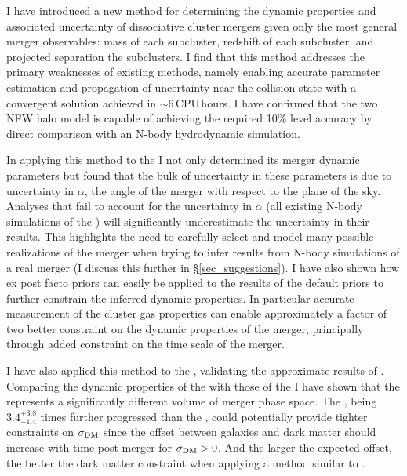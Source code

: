 \documentclass[12pt]{emulateapj}
\begin{document}
I have introduced a new method for determining the dynamic properties and associated uncertainty of dissociative cluster mergers given only the most general merger observables: mass of each subcluster, redshift of each subcluster, and projected separation the subclusters.
I find that this method addresses the primary weaknesses of existing methods, namely enabling accurate parameter estimation and propagation of uncertainty near the collision state with a convergent solution achieved in $\sim$6\,CPU\,hours. 
I have confirmed that the two NFW halo model is capable of achieving the required 10\% level accuracy by direct comparison with an N-body hydrodynamic simulation.

In applying this method to the  I not only determined its merger dynamic parameters but found that the bulk of uncertainty in these parameters is due to uncertainty in $\alpha$, the angle of the merger with respect to the plane of the sky.
Analyses that fail to account for the uncertainty in $\alpha$ (all existing N-body simulations of the ) will significantly underestimate the uncertainty in their results.
This highlights the need to carefully select and model many possible realizations of the merger when trying to infer results from N-body simulations of a real merger (I discuss this further in \S\ref{sec_suggestions}).
I have also shown how ex post facto priors can easily be applied to the results of the default priors to further constrain the inferred dynamic properties.
In particular accurate measurement of the cluster gas properties can enable approximately a factor of two better constraint on the dynamic properties of the merger, principally through added constraint on the time scale of the merger.

I have also applied this method to the , validating the approximate results of \citet{Dawson:2012dl}.
Comparing the dynamic properties of the  with those of the  I have shown that the  represents a significantly different volume of merger phase space.
The , being $3.4^{+3.8}_{-1.4}$ times further progressed than the , could potentially provide tighter constraints on $\sigma_{\rm DM}$ since the offset between galaxies and dark matter should increase with time post-merger for  $\sigma_{\rm DM}>0$.
And the larger the expected offset, the better the dark matter constraint when applying a method similar to \citet{Randall:2008hs}.
\end{document}

